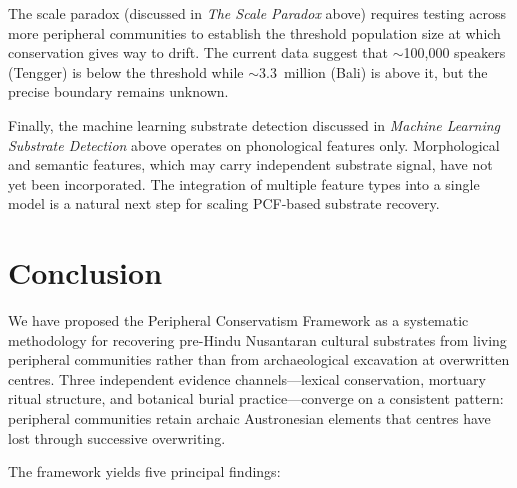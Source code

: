 \documentclass[12pt,a4paper]{article}
\begin{document}
The scale paradox (discussed in \emph{The Scale Paradox} above) requires testing across more peripheral communities to establish the threshold population size at which conservation gives way to drift. The current data suggest that $\sim$100,000 speakers (Tengger) is below the threshold while $\sim$3.3~million (Bali) is above it, but the precise boundary remains unknown.

Finally, the machine learning substrate detection discussed in \emph{Machine Learning Substrate Detection} above operates on phonological features only. Morphological and semantic features, which may carry independent substrate signal, have not yet been incorporated. The integration of multiple feature types into a single model is a natural next step for scaling PCF-based substrate recovery.

\section{Conclusion}

We have proposed the Peripheral Conservatism Framework as a systematic methodology for recovering pre-Hindu Nusantaran cultural substrates from living peripheral communities rather than from archaeological excavation at overwritten centres. Three independent evidence channels---lexical conservation, mortuary ritual structure, and botanical burial practice---converge on a consistent pattern: peripheral communities retain archaic Austronesian elements that centres have lost through successive overwriting.

The framework yields five principal findings:
\end{document}
